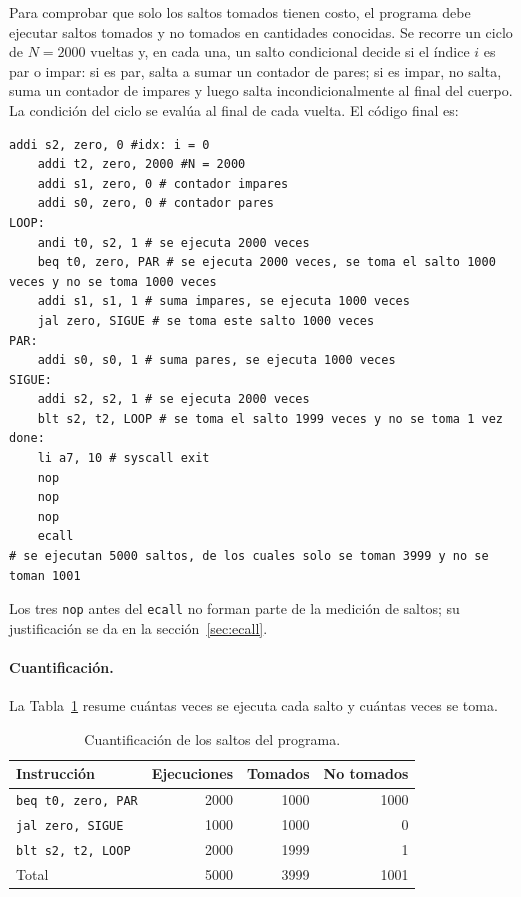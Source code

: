 \documentclass[11pt,a4paper]{article}
\begin{document}
Para comprobar que solo los saltos tomados tienen costo, el programa debe
ejecutar saltos tomados y no tomados en cantidades conocidas. Se recorre un
ciclo de $N=2000$ vueltas y, en cada una, un salto condicional decide si el
\'indice $i$ es par o impar: si es par, salta a sumar un contador de pares; si
es impar, no salta, suma un contador de impares y luego salta
incondicionalmente al final del cuerpo. La condici\'on del ciclo se eval\'ua al
final de cada vuelta. El c\'odigo final es:
 
\begin{lstlisting}[style=asm,caption={Programa de saltos (versi\'on para el procesador con hazard unit).},label={lst:saltos}]
    addi s2, zero, 0 #idx: i = 0
    addi t2, zero, 2000 #N = 2000
    addi s1, zero, 0 # contador impares
    addi s0, zero, 0 # contador pares
LOOP:
    andi t0, s2, 1 # se ejecuta 2000 veces
    beq t0, zero, PAR # se ejecuta 2000 veces, se toma el salto 1000 veces y no se toma 1000 veces
    addi s1, s1, 1 # suma impares, se ejecuta 1000 veces
    jal zero, SIGUE # se toma este salto 1000 veces
PAR:
    addi s0, s0, 1 # suma pares, se ejecuta 1000 veces
SIGUE:
    addi s2, s2, 1 # se ejecuta 2000 veces
    blt s2, t2, LOOP # se toma el salto 1999 veces y no se toma 1 vez
done:
    li a7, 10 # syscall exit
    nop
    nop
    nop
    ecall
# se ejecutan 5000 saltos, de los cuales solo se toman 3999 y no se toman 1001
\end{lstlisting}
 
Los tres \texttt{nop} antes del \texttt{ecall} no forman parte de la medici\'on
de saltos; su justificaci\'on se da en la secci\'on~\ref{sec:ecall}.
 
\paragraph{Cuantificaci\'on.}
La Tabla~\ref{tab:saltos} resume cu\'antas veces se ejecuta cada salto y cu\'antas
veces se toma.
 
\begin{table}[h]
  \centering
  \begin{tabular}{@{}lrrr@{}}
    \toprule
    Instrucci\'on & Ejecuciones & Tomados & No tomados \\
    \midrule
    \texttt{beq t0, zero, PAR}  & 2000 & 1000 & 1000 \\
    \texttt{jal zero, SIGUE}    & 1000 & 1000 & 0    \\
    \texttt{blt s2, t2, LOOP}   & 2000 & 1999 & 1    \\
    \midrule
    Total                       & 5000 & 3999 & 1001 \\
    \bottomrule
  \end{tabular}
  \caption{Cuantificaci\'on de los saltos del programa.}
  \label{tab:saltos}
\end{table}
 
\end{document}

